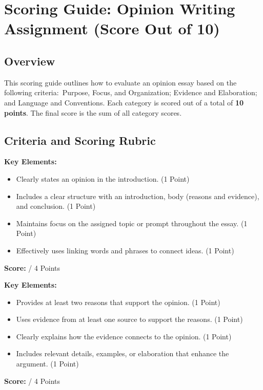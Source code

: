 \documentclass[12pt]{article}
\begin{document}
\section*{Scoring Guide: Opinion Writing Assignment (Score Out of 10)}

\subsection*{Overview}
This scoring guide outlines how to evaluate an opinion essay based on the following criteria:\ Purpose, Focus, and Organization; Evidence and Elaboration; and Language and Conventions. Each category is scored out of a total of \textbf{10 points}. The final score is the sum of all category scores.

\subsection*{Criteria and Scoring Rubric}

\begin{tcolorbox}[colframe=black!60, colback=white, title=Purpose, Focus, and Organization (0-4 Points)]
\textbf{Key Elements:}
\begin{itemize}
    \item Clearly states an opinion in the introduction. \hfill (1 Point)
    \item Includes a clear structure with an introduction, body (reasons and evidence), and conclusion. \hfill (1 Point)
    \item Maintains focus on the assigned topic or prompt throughout the essay. \hfill (1 Point)
    \item Effectively uses linking words and phrases to connect ideas. \hfill (1 Point)
\end{itemize}
\textbf{Score:} \underline{\hspace{2cm}} / 4 Points
\end{tcolorbox}

\begin{tcolorbox}[colframe=black!60, colback=white, title=Evidence and Elaboration (0-4 Points)]
\textbf{Key Elements:}
\begin{itemize}
    \item Provides at least two reasons that support the opinion. \hfill (1 Point)
    \item Uses evidence from at least one source to support the reasons. \hfill (1 Point)
    \item Clearly explains how the evidence connects to the opinion. \hfill (1 Point)
    \item Includes relevant details, examples, or elaboration that enhance the argument. \hfill (1 Point)
\end{itemize}
\textbf{Score:} \underline{\hspace{2cm}} / 4 Points
\end{tcolorbox}
\end{document}
